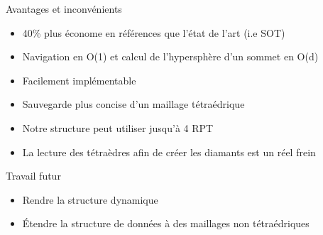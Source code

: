 \documentclass[9pt]{beamer}
\begin{document}
\begin{frame}
\begin{block}{Avantages et inconvénients}
\begin{itemize}
\color{blue}
\item 40\% plus économe en références que l'état de l'art (i.e SOT)
\item Navigation en O(1) et calcul de l'hypersphère d'un sommet en O(d)
\item Facilement implémentable
\item Sauvegarde plus concise d'un maillage tétraédrique
\color{red}
\item Notre structure peut utiliser jusqu'à 4 RPT
\item La lecture des tétraèdres afin de créer les diamants est un réel frein
\end{itemize}
\color{blue}
\end{block}
\vspace{-4.5pt}
\begin{block}{Travail futur}
\begin{itemize}
\item Rendre la structure dynamique
\item \'{E}tendre la structure de données à des maillages non tétraédriques
\end{itemize}
\end{block}
\end{frame}
\end{document}
